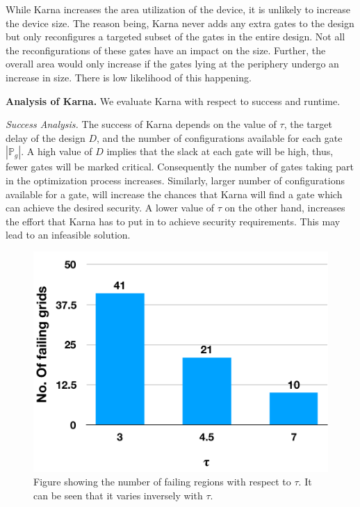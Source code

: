 While {\sf Karna} increases the area utilization of the device, it is unlikely to increase the  device size. The reason being, {\sf Karna} never adds any extra gates to the design but only reconfigures a targeted subset of the gates in the entire design. 
Not all the reconfigurations of these gates have an impact on the size. Further, the overall area would only increase if the gates lying at the periphery undergo an increase in size. There is low likelihood of this happening.


{\flushleft \bf Analysis of {\sf Karna}. }
We evaluate {\sf Karna} with respect to success and runtime.

{\flushleft \em Success Analysis.}
The success of {\sf Karna} depends on the value of $\tau$, the target delay of the design $D$, and the number of configurations available for each gate $|\mathbb P_g|$. A high value of $D$ implies that the slack at each gate will be high, thus, fewer gates will be marked critical. Consequently the number of gates taking part in the optimization process increases. Similarly, larger number of configurations available for a gate, will increase the chances that {\sf Karna} will find a gate which can achieve the desired security. A lower value of $\tau$ on the other hand, increases the effort that {\sf Karna} has to put in to achieve  security requirements. This may lead to an infeasible solution. 

\begin{figure}[t!]
\centering
\includegraphics[scale=0.35]{Chapter4/fig/tvla.pdf}
\caption{Figure showing the number of failing regions with respect to $\tau$. It can be seen that it varies inversely with $\tau$.}
\label{fig:runtime}
\end{figure}

